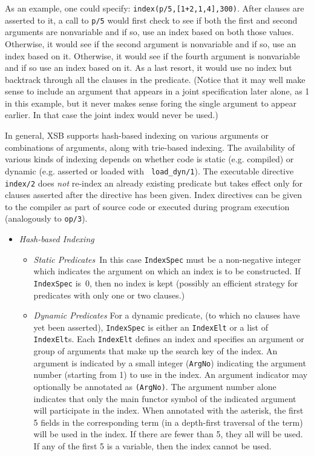 \begin{description}
{As an example, one could specify: {\tt index(p/5,[1+2,1,4],300)}.
After clauses are asserted to it, a call to {\tt p/5} would first
check to see if both the first and second arguments are nonvariable
and if so, use an index based on both those values. Otherwise, it
would see if the second argument is nonvariable and if so, use an
index based on it. Otherwise, it would see if the fourth argument is
nonvariable and if so use an index based on it. As a last resort, it would
use no index but backtrack through all the clauses in the predicate.
(Notice that it may well make sense to include an argument that 
appears in a joint specification later alone, as 1 in this example,
but it never makes sense foring the single argument to appear earlier. In
that case the joint index would never be used.)

}

\label{index_dynamic} 

In general, XSB supports hash-based indexing on various arguments or
combinations of arguments, along with trie-based indexing.  The
availability of various kinds of indexing depends on whether code is
static (e.g. compiled) or dynamic (e.g. asserted or loaded with {\tt
load\_dyn/1}).  The executable directive {\tt index/2} does {\em
not\/} re-index an already existing predicate but takes effect only
for clauses asserted after the directive has been given.  Index
directives can be given to the compiler as part of source code or
executed during program execution (analogously to {\tt op/3}).

\begin{itemize}
\item {\em Hash-based Indexing} 
\begin{itemize}
\item {\em Static Predicates}\ 
In this case {\tt IndexSpec} must be a non-negative integer which
indicates the argument on which an index is to be constructed.  If
{\tt IndexSpec} is~0, then no index is kept (possibly an efficient
strategy for predicates with only one or two clauses.)
\item {\em Dynamic Predicates}
For a dynamic predicate, (to which no clauses have yet been asserted),
{\tt IndexSpec} is either an {\tt IndexElt} or a list of {\tt
IndexElt}s.  Each {\tt IndexElt} defines an index and specifies an argument or group of
arguments that make up the search key of the index.  An argument is
indicated by a small integer ({\tt ArgNo}) indicating the argument number (starting
from 1) to use in the index.  An argument indicator may optionally be annotated
as {\tt *(ArgNo)}.  The argument number alone indicates that only the
main functor symbol of the indicated argument will participate in the
index.  When annotated with the asterisk, the first 5 fields in the
corresponding term (in a depth-first traversal of the term) will be
used in the index.  If there are fewer than 5, they all will be used.
If any of the first 5 is a variable, then the index cannot be used.


\end{itemize}
\end{itemize}
\end{description}
